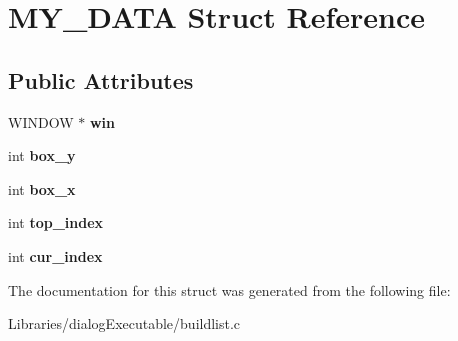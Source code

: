 \hypertarget{struct_m_y___d_a_t_a}{}\section{M\+Y\+\_\+\+D\+A\+TA Struct Reference}
\label{struct_m_y___d_a_t_a}
\subsection*{Public Attributes}
\begin{DoxyCompactItemize}
\item 
W\+I\+N\+D\+OW $\ast$ {\bfseries win}\hypertarget{struct_m_y___d_a_t_a_aa7b6e6aa7f12dfc45d2913681d1d85c0}{}\label{struct_m_y___d_a_t_a_aa7b6e6aa7f12dfc45d2913681d1d85c0}

\item 
int {\bfseries box\+\_\+y}\hypertarget{struct_m_y___d_a_t_a_a6271d04641609551360e106303e2c6b6}{}\label{struct_m_y___d_a_t_a_a6271d04641609551360e106303e2c6b6}

\item 
int {\bfseries box\+\_\+x}\hypertarget{struct_m_y___d_a_t_a_a6bc9b3d51ab1e9e015c5aa9be47d2417}{}\label{struct_m_y___d_a_t_a_a6bc9b3d51ab1e9e015c5aa9be47d2417}

\item 
int {\bfseries top\+\_\+index}\hypertarget{struct_m_y___d_a_t_a_ae471297798cf7dd02cc2d3fac6065932}{}\label{struct_m_y___d_a_t_a_ae471297798cf7dd02cc2d3fac6065932}

\item 
int {\bfseries cur\+\_\+index}\hypertarget{struct_m_y___d_a_t_a_a4f62cf1d1178b66d547745c66caa6622}{}\label{struct_m_y___d_a_t_a_a4f62cf1d1178b66d547745c66caa6622}

\end{DoxyCompactItemize}


The documentation for this struct was generated from the following file\+:\begin{DoxyCompactItemize}
\item 
Libraries/dialog\+Executable/buildlist.\+c\end{DoxyCompactItemize}
